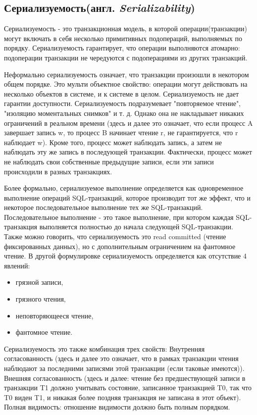 \documentclass[12pt,  openany]{book}
\begin{document}
\subsection{Сериализуемость(англ.  \textit{Serializability})}
Сериализуемость - это транзакционная модель, в которой операции(транзакции) могут включать в себя несколько примитивных подопераций, выполняемых по порядку. Сериализуемость гарантирует, что операции выполняются атомарно: подоперации транзакции не чередуются с подоперациями из других транзакций.
\par
Неформально сериализуемость означает, что транзакции произошли в некотором общем порядке.
Это мульти объектное свойство: операции могут действовать на несколько объектов в системе, и к системе в целом.
Сериализуемость не дает гарантии доступности.
Сериализуемость подразумевает "повторяемое чтение", "изоляцию моментальных снимков" и т. д. Однако она не накладывает никаких ограничений в реальном времени (здесь и далее это означает, что если процесс A завершает запись w, то процесс B начинает чтение r, не гарантируется, что r наблюдает w).
Кроме того, процесс может наблюдать запись, а затем не наблюдать эту же запись в последующей транзакции. Фактически, процесс может не наблюдать свои собственные предыдущие записи, если эти записи происходили в разных транзакциях.
\par
Более формально, сериализуемое выполнение определяется как одновременное выполнение операций SQL-транзакций, которое производит тот же эффект, что и некоторое последовательное выполнение тех же SQL-транзакций. Последовательное выполнение - это такое выполнение, при котором каждая SQL-транзакция выполняется полностью до начала следующей SQL-транзакции.
Также можно говорить, что сериализуемость это read committed (чтение фиксированных данных), но с дополнительным ограничением на фантомное чтение.
В другой формулировке сериализуемость определяется как отсутствие 4 явлений:
\begin{itemize}
  \item грязной записи,
  \item грязного чтения,
  \item неповторяющееся чтение,
  \item фантомное чтение.
\end{itemize}
Сериализуемость это также комбинация трех свойств:
Внутренняя согласованность (здесь и далее это означает, что в рамках транзакции чтения наблюдают за последними записями этой транзакции (если таковые имеются)).
Внешняя согласованность (здесь и далее: чтение без предшествующей записи в транзакции T1 должно учитывать состояние, записанное транзакцией T0, так что T0 виден T1, и никакая более поздняя транзакция не записана в этот объект).
Полная видимость: отношение видимости должно быть полным порядком.
\end{document}
